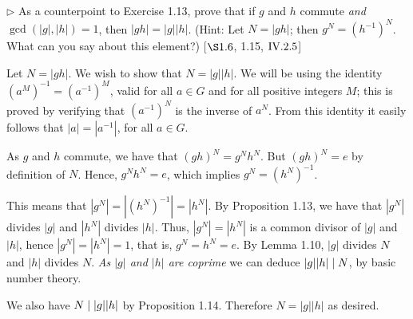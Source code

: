 \begin{exercise}
	$\triangleright$ As a counterpoint to Exercise 1.13, prove that if $g$ and $h$ commute \emph{and} $\gcd(|g|,|h|) = 1$, then $|gh| = |g||h|$. (Hint: Let $N=|gh|$; then $g^N = (h^{-1})^N$. What can you say about this element?) [$\S 1.6$, 1.15, $\RNo{4}.2.5$]
\end{exercise}
\begin{solution}
	Let $N = |gh|$. We wish to show that $N = |g||h|$. We will be using the identity $(a^M)^{-1} = (a^{-1})^M$, valid for all $a\in G$ and for all positive integers $M$; this is proved by verifying that $(a^{-1})^N$ is the inverse of $a^N$. From this identity it easily follows that $|a| = |a^{-1}|$, for all $a\in G$.
		
	As $g$ and $h$ commute, we have that $(gh)^N = g^N h^N$. But $(gh)^N = e$ by definition of $N$. Hence, $g^N h^N = e$, which implies $g^N = (h^N)^{-1}$.
	
	This means that $|g^N|= |(h^N)^{-1}| = |h^N|$. By Proposition 1.13, we have that $|g^N|$ divides $|g|$ and $|h^N|$ divides $|h|$. Thus, $|g^N| = |h^N|$ is a common divisor of $|g|$ and $|h|$, hence $|g^N| = |h^N| = 1$, that is, $g^N = h^N = e$. By Lemma 1.10, $|g|$ divides $N$ and $|h|$ divides $N$. \emph{As $|g|$ and $|h|$ are coprime} we can deduce $|g||h|\mid N$, by basic number theory. 
	
	We also have $N \mid |g||h|$ by Proposition 1.14. Therefore $N = |g||h|$ as desired.
\end{solution}

